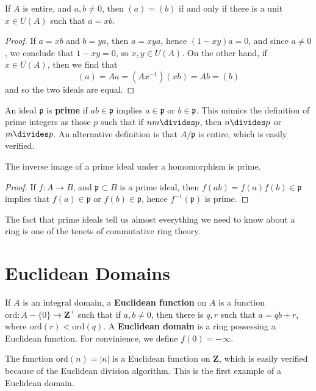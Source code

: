 \begin{theorem}
    If $A$ is entire, and $a,b \neq 0$, then $(a) = (b)$ if and only if there is a unit $x \in U(A)$ such that $a = xb$.
\end{theorem}
\begin{proof}
    If $a = xb$ and $b = ya$, then $a = xya$, hence $(1 - xy)a = 0$, and since $a \neq 0$, we conclude that $1 - xy = 0$, so $x,y \in U(A)$. On the other hand, if $x \in U(A)$, then we find that
    \[ (a) = Aa = (Ax^{-1})(xb) = Ab = (b) \]
    and so the two ideals are equal.
\end{proof}

An ideal $\mathfrak{p}$ is {\bf prime} if $ab \in \mathfrak{p}$ implies $a \in \mathfrak{p}$ or $b \in \mathfrak{p}$. This mimics the definition of prime integers as those $p$ such that if $nm \divides p$, then $n \divides p$ or $m \divides p$. An alternative definition is that $A/\mathfrak{p}$ is entire, which is easily verified.

\begin{theorem}
    The inverse image of a prime ideal under a homomorphism is prime.
\end{theorem}
\begin{proof}
    If $f: A \to B$, and $\mathfrak{p} \subset B$ is a prime ideal, then $f(ab) = f(a)f(b) \in \mathfrak{p}$ implies that $f(a) \in \mathfrak{p}$ or $f(b) \in \mathfrak{p}$, hence $f^{-1}(\mathfrak{p})$ is prime.
\end{proof}

The fact that prime ideals tell us almost everything we need to know about a ring is one of the tenets of commutative ring theory.

\section{Euclidean Domains}

If $A$ is an integral domain, a {\bf Euclidean function} on $A$ is a function $\text{ord}: A - \{ 0 \} \to \mathbf{Z}^+$ such that if $a,b \neq 0$, then there is $q,r$ such that $a = qb + r$, where $\text{ord}(r) < \text{ord}(q)$. A {\bf Euclidean domain} is a ring possessing a Euclidean function. For convinience, we define $f(0) = -\infty$.

\begin{example}
    The function $\text{ord}(n) = |n|$ is a Euclidean function on $\mathbf{Z}$, which is easily verified because of the Euclidean division algorithm. This is the first example of a Euclidean domain.
\end{example}

